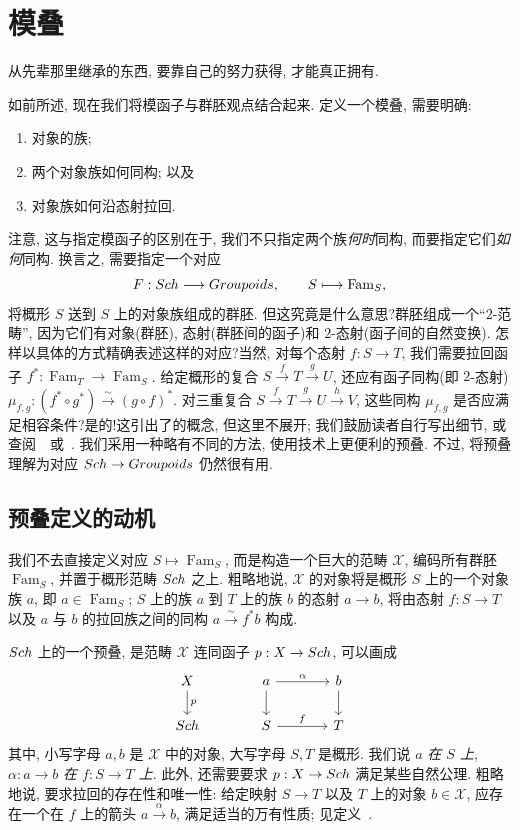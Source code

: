 \section{模叠}\label{src:1.6}
\begin{epigraph}
从先辈那里继承的东西, 要靠自己的努力获得, 才能真正拥有.
\end{epigraph}
如前所述, 现在我们将模函子与群胚观点结合起来. 定义一个模叠, 需要明确: 
\begin{enumerate}[(1)]
\item 对象的族; 
\item 两个对象族如何同构; 以及
\item 对象族如何沿态射拉回.
\end{enumerate}
注意, 这与指定模函子的区别在于, 我们不只指定两个族\textit{何时}同构, 而要指定它们\textit{如何}同构. 换言之, 需要指定一个对应
\[
F:Sch\longrightarrow Groupoids,\qquad S\longmapsto\operatorname{Fam}_S,
\]
将概形 $S$ 送到 $S$ 上的对象族组成的群胚. 但这究竟是什么意思?群胚组成一个``$2$-范畴'', 因为它们有对象(群胚), 态射(群胚间的函子)和 $2$-态射(函子间的自然变换). 怎样以具体的方式精确表述这样的对应?当然, 对每个态射 $f:S\to T$, 我们需要拉回函子 $f^*:\operatorname{Fam}_T\to\operatorname{Fam}_S$. 给定概形的复合 $S\xrightarrow{f}T\xrightarrow{g}U$, 还应有函子同构(即 $2$-态射)$\mu_{f,g}:(f^*\circ g^*)\xrightarrow{\sim}(g\circ f)^*$. 对三重复合 $S\xrightarrow{f}T\xrightarrow{g}U\xrightarrow{h}V$, 这些同构 $\mu_{f,g}$ 是否应满足相容条件?是的!这引出了的概念, 但这里不展开; 我们鼓励读者自行写出细节, 或查阅~\cite[定义 $3.10$]{Vis05}~或~\cite[Tag 003N]{SP}. 我们采用一种略有不同的方法, 使用技术上更便利的预叠. 不过, 将预叠理解为对应 $Sch\to Groupoids$ 仍然很有用.

\subsection{预叠定义的动机}\label{src:1.6.1-subsection}
我们不去直接定义对应 $S\mapsto\operatorname{Fam}_S$, 而是构造一个巨大的范畴 $\mathcal X$, 编码所有群胚 $\operatorname{Fam}_S$, 并置于概形范畴 $Sch$ 之上. 粗略地说, $\mathcal X$ 的对象将是概形 $S$ 上的一个对象族 $a$, 即 $a\in\operatorname{Fam}_S$; $S$ 上的族 $a$ 到 $T$ 上的族 $b$ 的态射 $a\to b$, 将由态射 $f:S\to T$ 以及 $a$ 与 $b$ 的拉回族之间的同构 $a\xrightarrow{\sim}f^*b$ 构成.

$Sch$ 上的一个预叠, 是范畴 $\mathcal X$ 连同函子 $p:X\to Sch$, 可以画成
\[
\begin{tikzcd}[column sep=large]
\mathcal X\arrow[d,"p"] & a\arrow[r,"\alpha"]\arrow[d] & b\arrow[d]\\
\Sch & S\arrow[r,"f"] & T
\end{tikzcd}
\]
其中, 小写字母 $a,b$ 是 $\mathcal X$ 中的对象, 大写字母 $S,T$ 是概形. 我们说 $a$ \textit{在 $S$ 上}, $\alpha:a\to b$ \textit{在 $f:S\to T$ 上}. 此外, 还需要要求 $p:X\to Sch$ 满足某些自然公理. 粗略地说, 要求拉回的存在性和唯一性: 给定映射 $S\to T$ 以及 $T$ 上的对象 $b\in\mathcal X$, 应存在一个在 $f$ 上的箭头 $a\xrightarrow{\alpha}b$, 满足适当的万有性质; 见定义~.

